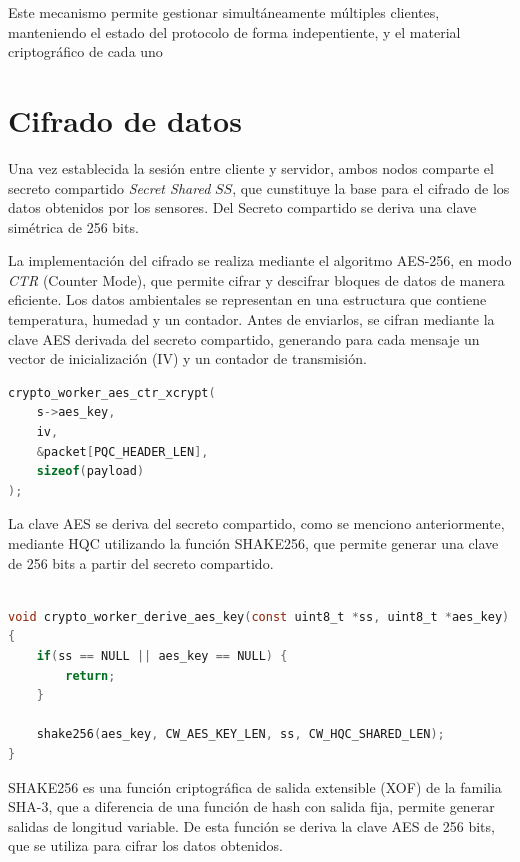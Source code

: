 Este mecanismo permite gestionar simultáneamente múltiples clientes, manteniendo el estado del protocolo de forma indepentiente, y el material criptográfico
de cada uno

\section{Cifrado de datos}

Una vez establecida la sesión entre cliente y servidor, ambos nodos comparte el secreto compartido \textit{Secret Shared} \(SS\), que cunstituye 
la base para el cifrado de los datos obtenidos por los sensores. Del Secreto compartido se deriva una clave simétrica de 256 bits. 

La implementación del cifrado se realiza mediante el algoritmo AES-256, en modo \textit{CTR} (Counter Mode), que permite cifrar y descifrar bloques de datos de manera eficiente. 
Los datos ambientales se representan en una estructura que contiene temperatura, humedad y un contador. Antes de enviarlos, se cifran mediante la clave AES derivada del secreto compartido,
generando para cada mensaje un vector de inicialización (IV) y un contador de transmisión. 

\begin{lstlisting}[language=C, caption=Operación de cifrado de datos, label=lst:encrypt_data]
crypto_worker_aes_ctr_xcrypt(
    s->aes_key,
    iv,
    &packet[PQC_HEADER_LEN],
    sizeof(payload)
);

\end{lstlisting}

La clave AES se deriva del secreto compartido, como se menciono anteriormente, mediante 
HQC utilizando la función SHAKE256, que permite generar una clave de 256 bits a partir del secreto compartido. 

\begin{lstlisting}[language=C, caption=Derivación de la clave AES, label=lst:derive_aes_key]

void crypto_worker_derive_aes_key(const uint8_t *ss, uint8_t *aes_key)
{
    if(ss == NULL || aes_key == NULL) {
        return;
    }

    shake256(aes_key, CW_AES_KEY_LEN, ss, CW_HQC_SHARED_LEN);
}

\end{lstlisting}

SHAKE256 es una función criptográfica de salida extensible (XOF) de la familia SHA-3, que a diferencia de una función de hash con salida fija, 
permite generar salidas de longitud variable. De esta función se deriva la clave AES de 256 bits, que se utiliza para cifrar los datos
obtenidos. 

